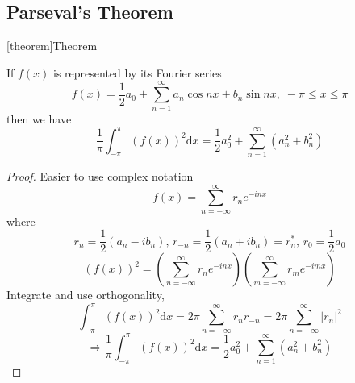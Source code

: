 \documentclass[12pt]{report}
\theoremstyle{definition}
\begin{document}
\subsection{Parseval's Theorem}
[theorem]{Theorem}
\begin{Parseval's Theorem}
    If $f(x)$ is represented by its Fourier series\[
        f(x) = \frac{1}{2} a_0 + \sum_{n=1}^{\infty} a_n \cos{nx} + b_n \sin{nx}, \;-\pi \le x \le \pi
    \]then we have \[
    \frac{1}{\pi}\int_{-\pi}^{\pi} {(f(x))}^{2} \mathrm{d}x 
    = \frac{1}{2}a_0^{2} + \sum_{n=1}^{\infty} (a^{2}_n + b^{2}_n)
    \]
\end{Parseval's Theorem}
\begin{proof}
    Easier to use complex notation \[
        f(x) = \sum_{n=-\infty}^{\infty} r_n e^{-inx}
    \]where\[
    r_n = \frac{1}{2}(a_n - ib_n), \,r_{-n} = \frac{1}{2} (a_n + ib_n) = r^{*}_n, \,r_0 = \frac{1}{2}a_0
    \]\[
    {(f(x))}^{2} = 
    \left(\sum_{n=-\infty}^{\infty} r_n e^{-inx}\right) 
    \left(\sum_{m=-\infty}^{\infty} r_m e^{-imx}\right) 
    \]Integrate and use orthogonality, \[
    \int_{-\pi}^{\pi} {(f(x))}^{2}\mathrm{d}x = 2\pi \sum_{n=-\infty}^{\infty} r_n r_{-n}
    = 2\pi\sum_{n=-\infty}^{\infty} {|r_n|}^{2}
    \]\[
    \Rightarrow \frac{1}{\pi} \int_{-\pi}^{\pi} {(f(x))}^{2}\mathrm{d}x 
    = \frac{1}{2} a_0^{2} + \sum_{n=1}^{\infty} (a_n^{2} + b_n^{2})
    \]
\end{proof}
\end{document}
